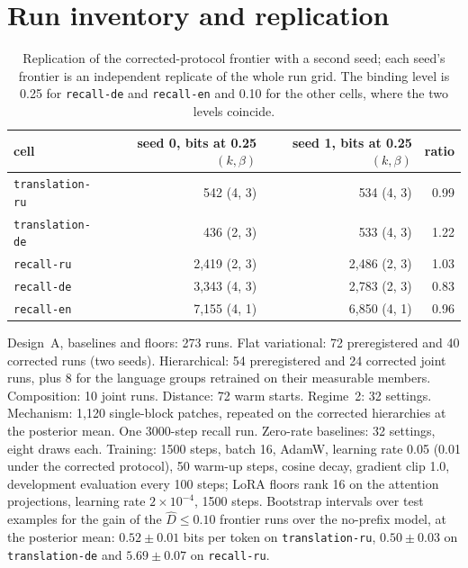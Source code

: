 \documentclass{article}
\newcommand{\Dh}{\hat D}
\newcommand{\cell}[1]{\texttt{#1}}
\begin{document}
\section{Run inventory and replication}\label{app:inventory}
\begin{table}[H]
\centering\small
\begin{tabular}{lrrr}
\toprule
cell & seed 0, bits at 0.25 $(k,\beta)$ & seed 1, bits at 0.25 $(k,\beta)$ & ratio \\
\midrule
\cell{translation-ru} & 542 (4, 3) & 534 (4, 3) & 0.99 \\
\cell{translation-de} & 436 (2, 3) & 533 (4, 3) & 1.22 \\
\cell{recall-ru} & 2,419 (2, 3) & 2,486 (2, 3) & 1.03 \\
\cell{recall-de} & 3,343 (4, 3) & 2,783 (2, 3) & 0.83 \\
\cell{recall-en} & 7,155 (4, 1) & 6,850 (4, 1) & 0.96 \\
\bottomrule
\end{tabular}
\caption{Replication of the corrected-protocol frontier with a second seed; each seed's frontier is an independent replicate of the whole run grid. The binding level is 0.25 for \cell{recall-de} and \cell{recall-en} and 0.10 for the other cells, where the two levels coincide.}
\label{tab:seeds}
\end{table}
Design~A, baselines and floors: 273 runs. Flat variational: 72 preregistered and 40 corrected runs (two seeds). Hierarchical: 54 preregistered and 24 corrected joint runs, plus 8 for the language groups retrained on their measurable members. Composition: 10 joint runs. Distance: 72 warm starts. Regime~2: 32 settings. Mechanism: 1,120 single-block patches, repeated on the corrected hierarchies at the posterior mean. One 3000-step recall run. Zero-rate baselines: 32 settings, eight draws each. Training: 1500 steps, batch 16, AdamW, learning rate 0.05 (0.01 under the corrected protocol), 50 warm-up steps, cosine decay, gradient clip 1.0, development evaluation every 100 steps; LoRA floors rank 16 on the attention projections, learning rate $2\times10^{-4}$, 1500 steps. Bootstrap intervals over test examples for the gain of the $\Dh\le0.10$ frontier runs over the no-prefix model, at the posterior mean: $0.52\pm0.01$ bits per token on \cell{translation-ru}, $0.50\pm0.03$ on \cell{translation-de} and $5.69\pm0.07$ on \cell{recall-ru}.

\FloatBarrier
\end{document}
